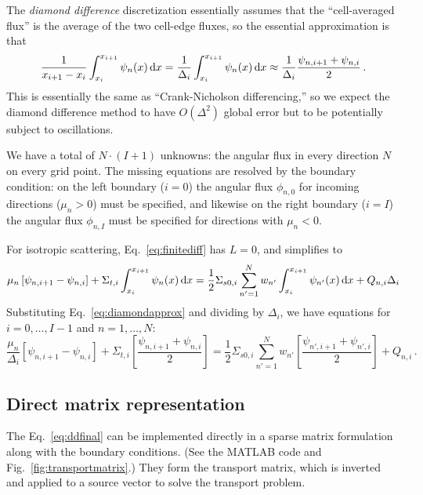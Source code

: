 \documentclass[]{SRJcommon}
\begin{document}
The \emph{diamond difference} discretization essentially assumes that the
``cell-averaged flux'' is the average of the two cell-edge fluxes, so the
essential approximation is that
\begin{equation}
  \frac{1}{x_{i+1} - x_{i}} \int_{x_{i}}^{x_{i+1}} \psi_{n}(x) \, \mathrm{d} x
 = \frac{1}{\Delta_i} \int_{x_{i}}^{x_{i+1}} \psi_{n}(x) \, \mathrm{d} x
\approx  \frac{1}{\Delta_i} \frac{\psi_{n,i+1} + \psi_{n,i}}{2} 
\,.
  \label{eq:diamondapprox}
\end{equation}
This is essentially the same as ``Crank-Nicholson differencing,'' so we expect
the diamond difference method to have $O(\Delta^2)$ global error but to be
potentially subject to oscillations.

We have a total of $N\cdot(I+1)$ unknowns: the angular flux in every
direction $N$ on every grid point. The missing equations are resolved by the
boundary condition: on the left boundary ($i=0$) the angular flux $\phi_{n,0}$
for incoming directions ($\mu_n > 0$) must be specified, and likewise on the
right boundary ($i=I$) the angular flux $\phi_{n,I}$ must be specified
for directions with $\mu_n < 0$.

For isotropic scattering, Eq.~\eqref{eq:finitediff} has $L=0$, and simplifies to
$$
 \mu_n \left[ \psi_{n,i+1} - \psi_{n,i} \right] + \Sigma_{t,i}
  \int_{x_{i}}^{x_{i+1}} \psi_n(x) \, \mathrm{d} x
= \frac{1}{2} \Sigma_{s0,i} 
 \sum_{n'=1}^{N} w_{n'}  \int_{x_{i}}^{x_{i+1}} \psi_{n'}(x) \, \mathrm{d} x
  + Q_{n,i}  \Delta_i
$$
Substituting Eq.~\eqref{eq:diamondapprox} and dividing by $\Delta_i$, we have equations for
$i=0,\ldots,I-1$ and $n=1,\ldots,N$:
\begin{equation}
  \frac{\mu_n}{\Delta_i}  \left[ \psi_{n,i+1} - \psi_{n,i} \right]
+ \Sigma_{t,i}  \left[ \frac{\psi_{n,i+1} + \psi_{n,i}}{2} \right]
=
\frac{1}{2} \Sigma_{s0,i}
\sum_{n'=1}^{N} w_{n'} \left[ \frac{\psi_{n',i+1} + \psi_{n',i}}{2} \right]
  + Q_{n,i} \,.
  \label{eq:ddfinal}
\end{equation}

\subsection{Direct matrix representation}
The Eq.~\eqref{eq:ddfinal} can be implemented directly in a sparse matrix
formulation along with the boundary conditions. (See the MATLAB
code and Fig.~\ref{fig:transportmatrix}.)
They form the transport matrix, which is inverted and applied to a source
vector to solve the transport problem.
\end{document}
